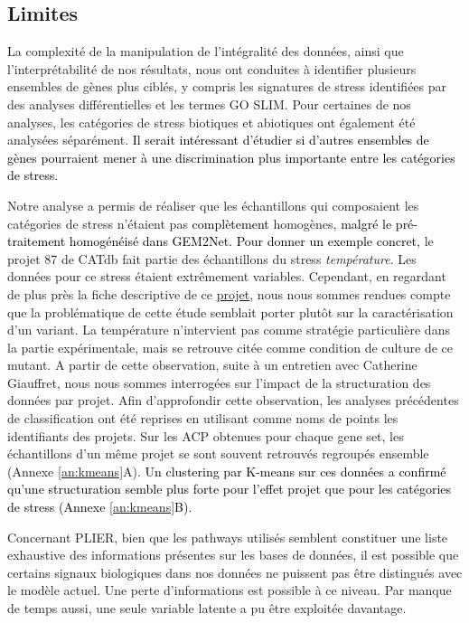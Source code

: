 \documentclass[twoside]{article}
\newcommand{\AR}[1]{\textcolor{black}{#1}}
\begin{document}
\newpage
\subsection{Limites}

\vspace{0.5cm}La complexité de la manipulation de l'intégralité des données, ainsi que l'interprétabilité de nos résultats, nous ont conduites à identifier plusieurs ensembles de gènes plus ciblés, y compris les signatures de stress identifiées par des analyses différentielles et les termes GO SLIM. Pour certaines de nos analyses, les catégories de stress biotiques et abiotiques ont également été analysées séparément. \AR{Il serait intéressant d'étudier si d'autres ensembles de gènes pourraient mener à une discrimination plus importante entre les catégories de stress.} 

\vspace{0.5cm}Notre analyse a permis de réaliser que les échantillons qui composaient les catégories de stress n'étaient pas \AR{complètement} homogènes, \AR{malgré le pré-traitement homogénéisé dans GEM2Net. Pour donner un exemple concret,} le projet 87 de CATdb fait partie des échantillons du stress \textit{température}. Les données pour ce stress étaient extrêmement variables. Cependant, en regardant de plus près la fiche descriptive de ce \hyperlink{http://tools.ips2.u-psud.fr/cgi-bin/projects/CATdb/consult_project.pl?project_id=87}{\underline{projet}}, nous nous sommes rendues compte que la problématique de cette étude semblait porter plutôt sur la caractérisation d'un variant. La température n'intervient pas comme stratégie particulière dans la partie expérimentale, mais se retrouve citée comme condition de culture de ce mutant. A partir de cette observation, suite à un entretien avec Catherine Giauffret, nous nous sommes interrogées sur l'impact de la structuration des données par projet. 
Afin d'approfondir cette observation, les analyses précédentes de classification ont été reprises en utilisant comme noms de points les identifiants des projets. Sur les ACP obtenues pour chaque gene set, les échantillons d'un même projet se sont souvent retrouvés regroupés ensemble (Annexe \ref{an:kmeans}A). \AR{Un clustering par K-means sur ces données a confirmé qu'une structuration semble plus forte pour l'effet projet que pour les catégories de stress (Annexe \ref{an:kmeans}B)}. 

\vspace{0.5cm}Concernant PLIER, bien que les pathways utilisés semblent constituer une liste exhaustive des informations présentes sur les bases de données, il est possible que certains signaux biologiques dans nos données ne puissent pas être distingués avec le modèle actuel. Une perte d'informations est possible à ce niveau. Par manque de temps aussi, une seule variable latente a pu être exploitée davantage. 
\end{document}

